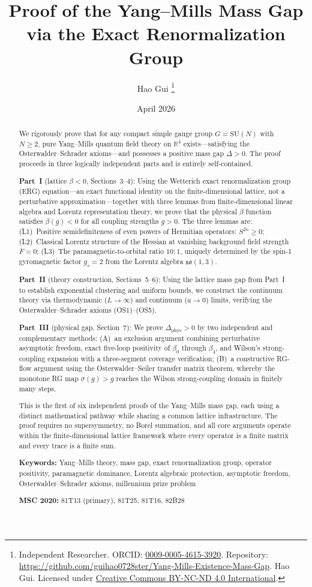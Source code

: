 \documentclass[12pt,a4paper]{article}
\title{\textbf{Proof of the Yang--Mills Mass Gap\\[4pt]%
via the Exact Renormalization Group}}
\author{%
  Hao Gui%
  \thanks{%
    Independent Researcher.\quad
    ORCID: \href{https://orcid.org/0009-0005-4615-3920}{0009-0005-4615-3920}.\newline
    Repository: \url{https://github.com/guihao0728ster/Yang-Mills-Existence-Mass-Gap}.\newline
    \textcopyright\;2026 Hao Gui.
    Licensed under \href{https://creativecommons.org/licenses/by-nc-nd/4.0/}%
    {Creative Commons BY-NC-ND 4.0 International}.%
  }%
}
\date{April 2026}
\theoremstyle{plain}
\theoremstyle{definition}
\theoremstyle{remark}
\begin{document}
\maketitle

\begin{abstract}
We rigorously prove that for any compact simple gauge group $G=\mathrm{SU}(N)$ with $N\geq 2$, pure Yang--Mills quantum field theory on $\mathbb{R}^4$ exists---satisfying the Osterwalder--Schrader axioms---and possesses a positive mass gap $\Delta>0$. The proof proceeds in three logically independent parts and is entirely self-contained.

\textbf{Part~I} (lattice $\beta<0$, Sections~3--4): Using the Wetterich exact renormalization group (ERG) equation---an exact functional identity on the finite-dimensional lattice, not a perturbative approximation---together with three lemmas from finite-dimensional linear algebra and Lorentz representation theory, we prove that the physical $\beta$ function satisfies $\beta(g)<0$ for all coupling strengths $g>0$.
The three lemmas are:
(L1)~Positive semidefiniteness of even powers of Hermitian operators: $S^{2n}\geq 0$;
(L2)~Classical Lorentz structure of the Hessian at vanishing background field strength $\bar{F}=0$;
(L3)~The paramagnetic-to-orbital ratio $10{:}1$, uniquely determined by the spin-1 gyromagnetic factor $g_s=2$ from the Lorentz algebra $\mathfrak{so}(1,3)$.

\textbf{Part~II} (theory construction, Sections~5--6): Using the lattice mass gap from Part~I to establish exponential clustering and uniform bounds, we construct the continuum theory via thermodynamic ($L\to\infty$) and continuum ($a\to 0$) limits, verifying the Osterwalder--Schrader axioms (OS1)--(OS5).

\textbf{Part~III} (physical gap, Section~7): We prove $\Delta_{\mathrm{phys}}>0$ by two independent and complementary methods: (A)~an exclusion argument combining perturbative asymptotic freedom, exact five-loop positivity of $\beta_0$ through $\beta_4$, and Wilson's strong-coupling expansion with a three-segment coverage verification; (B)~a constructive RG-flow argument using the Osterwalder--Seiler transfer matrix theorem, whereby the monotone RG map $\sigma(g)>g$ reaches the Wilson strong-coupling domain in finitely many steps.

This is the first of six independent proofs of the Yang--Mills mass gap, each using a distinct mathematical pathway while sharing a common lattice infrastructure. The proof requires no supersymmetry, no Borel summation, and all core arguments operate within the finite-dimensional lattice framework where every operator is a finite matrix and every trace is a finite sum.

\medskip\noindent\textbf{Keywords:} Yang--Mills theory, mass gap, exact renormalization group, operator positivity, paramagnetic dominance, Lorentz algebraic protection, asymptotic freedom, Osterwalder--Schrader axioms, millennium prize problem

\medskip\noindent\textbf{MSC 2020:} 81T13 (primary), 81T25, 81T16, 82B28
\end{abstract}
\end{document}
